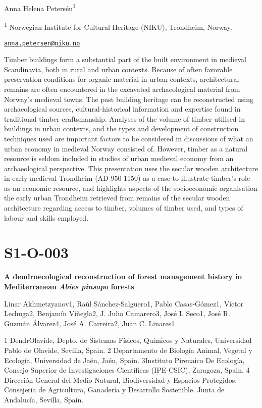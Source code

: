 \documentclass[
]{book}
\begin{document}
Anna Helena Petersén\textsuperscript{1}

\textsuperscript{1} Norwegian Institute for Cultural Heritage (NIKU), Trondheim, Norway.

\href{mailto:anna.petersen@niku.no}{\nolinkurl{anna.petersen@niku.no}}

Timber buildings form a substantial part of the built environment in
medieval Scandinavia, both in rural and urban contexts. Because of often
favorable preservation conditions for organic material in urban
contexts, architectural remains are often encountered in the excavated
archaeological material from Norway's medieval towns. The past building
heritage can be reconstructed using archaeological sources,
cultural-historical information and expertise found in traditional
timber craftsmanship. Analyses of the volume of timber utilised in
buildings in urban contexts, and the types and development of
construction techniques used are important factors to be considered in
discussions of what an urban economy in medieval Norway consisted of.
However, timber as a natural resource is seldom included in studies of
urban medieval economy from an archaeological perspective. This
presentation uses the secular wooden architecture in early medieval
Trondheim (AD 950-1150) as a case to illustrate timber's role as an
economic resource, and highlights aspects of the socioeconomic
organisation the early urban Trondheim retrieved from remains of the
secular wooden architecture regarding access to timber, volumes of
timber used, and types of labour and skills employed.

\hypertarget{s1-o-003}{%
\section*{S1-O-003}\label{s1-o-003}}

\textbf{A dendroecological reconstruction of forest management history in
Mediterranean \emph{Abies pinsapo} forests}

Linar Akhmetzyanov1, Raúl Sánchez-Salguero1, Pablo Casas-Gómez1, Víctor
Lechuga2, Benjamín Viñegla2, J. Julio Camarero3, José I. Seco1, José R.
Guzmán Álvarez4, José A. Carreira2, Juan C. Linares1

1 DendrOlavide, Depto. de Sistemas Físicos, Químicos y Naturales,
Universidad Pablo de Olavide, Sevilla, Spain. 2 Departamento de Biología
Animal, Vegetal y Ecología, Universidad de Jaén, Jaén, Spain. 3Instituto
Pirenaico De Ecología, Consejo Superior de Investigaciones Científicas
(IPE-CSIC), Zaragoza, Spain. 4 Dirección General del Medio Natural,
Biodiversidad y Espacios Protegidos. Consejería de Agricultura,
Ganadería y Desarrollo Sostenible. Junta de Andalucía, Sevilla, Spain.
\end{document}
